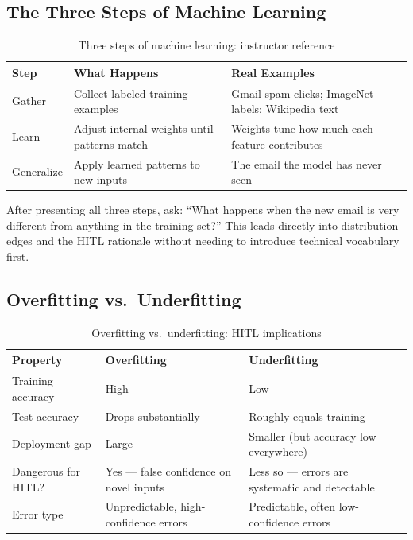 \subsection{The Three Steps of Machine Learning}

\begin{table}[htbp]
\caption{Three steps of machine learning: instructor reference}
\label{tab:three-steps-ch03}
\centering
\begin{tabular}{@{}p{2.5cm}p{4.5cm}p{4.5cm}@{}}
\toprule
\textbf{Step} & \textbf{What Happens} & \textbf{Real Examples} \\
\midrule
Gather & Collect labeled training examples & Gmail spam clicks; ImageNet labels; Wikipedia text \\
Learn & Adjust internal weights until patterns match & Weights tune how much each feature contributes \\
Generalize & Apply learned patterns to new inputs & The email the model has never seen \\
\bottomrule
\end{tabular}
\end{table}

\begin{keyconcept}
After presenting all three steps, ask: ``What happens when the new email is very different from anything in the training set?'' This leads directly into distribution edges and the HITL rationale without needing to introduce technical vocabulary first.
\end{keyconcept}

\subsection{Overfitting vs.\ Underfitting}

\begin{table}[htbp]
\caption{Overfitting vs.\ underfitting: HITL implications}
\label{tab:overfit-underfit}
\centering
\begin{tabular}{@{}p{3cm}p{4cm}p{4cm}@{}}
\toprule
\textbf{Property} & \textbf{Overfitting} & \textbf{Underfitting} \\
\midrule
Training accuracy & High & Low \\
Test accuracy & Drops substantially & Roughly equals training \\
Deployment gap & Large & Smaller (but accuracy low everywhere) \\
Dangerous for HITL? & Yes --- false confidence on novel inputs & Less so --- errors are systematic and detectable \\
Error type & Unpredictable, high-confidence errors & Predictable, often low-confidence errors \\
\bottomrule
\end{tabular}
\end{table}

